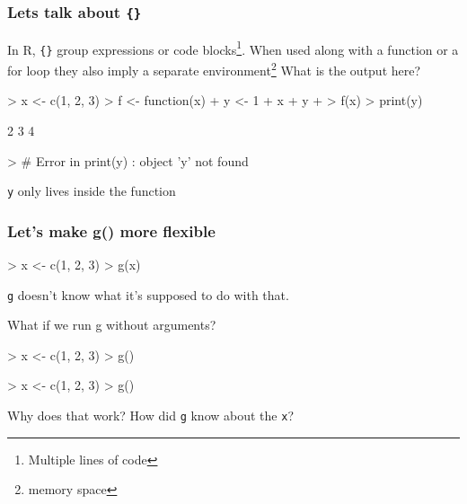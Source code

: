 \documentclass{beamer}
\newcommand{\R}[1]{\texttt{#1}}
\begin{document}
\begin{frame}[fragile]
\frametitle{Lets talk about \R{\{\}}}
In R, \R{\{\}} group expressions or code blocks\footnote{Multiple lines of code}. When used along with a function or a for loop they also imply a separate environment\footnote{memory space}
\pause
What is the output here?
\begin{Schunk}
\begin{Sinput}
> x <- c(1, 2, 3)
> f <- function(x) { 
+     y <- 1
+     x + y
+ }
> f(x)
> print(y)
\end{Sinput}
\end{Schunk}
\pause
\begin{Schunk}
\begin{Soutput}
[1] 2 3 4
\end{Soutput}
\end{Schunk}
\begin{Schunk}
\begin{Sinput}
> # Error in print(y) : object 'y' not found
\end{Sinput}
\end{Schunk}
\R{y} only lives inside the function

\end{frame}


\begin{frame}[fragile]
\frametitle{Let's make g() more flexible}
\begin{Schunk}
\begin{Sinput}
> x <- c(1, 2, 3)
> g(x)
\end{Sinput}
\end{Schunk}
\pause
\R{g} doesn't know what it's supposed to do with that.

\pause
What if we run g without arguments?
\begin{Schunk}
\begin{Sinput}
> x <- c(1, 2, 3)
> g()
\end{Sinput}
\end{Schunk}
\pause
\begin{Schunk}
\begin{Sinput}
> x <- c(1, 2, 3)
> g()
\end{Sinput}
\end{Schunk}
Why does that work? How did \R{g} know about the \R{x}?
\end{frame}




\end{document}
